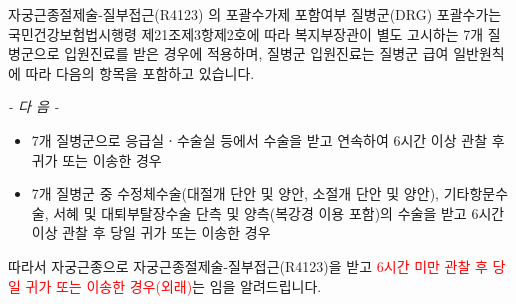 \begin{commentbox}{자궁근종절제술-질부접근(R4123) 의 포괄수가제 포함여부}
질병군(DRG) 포괄수가는 국민건강보험법시행령 제21조제3항제2호에 따라 복지부장관이 별도 고시하는 7개 질병군으로 입원진료를 받은 경우에 적용하며, 질병군 입원진료는 질병군 급여 일반원칙에 따라 다음의 항목을 포함하고 있습니다.\par
\begin{center}\emph{- 다 음 -}\end{center}
\begin{itemize}\tightlist
\item 7개 질병군으로 응급실ㆍ수술실 등에서 수술을 받고 연속하여 6시간 이상 관찰 후 귀가 또는 이송한 경우 
\item 7개 질병군 중 수정체수술(대절개 단안 및 양안, 소절개 단안 및 양안), 기타항문수술, 서혜 및 대퇴부탈장수술 단측 및 양측(복강경 이용 포함)의 수술을 받고 6시간 이상 관찰 후 당일 귀가 또는 이송한 경우
\end{itemize}
따라서 자궁근종으로 자궁근종절제술-질부접근(R4123)을 받고 \textcolor{red}{6시간 미만 관찰 후 당일 귀가 또는 이송한 경우(외래)}는 임을 알려드립니다.
\end{commentbox}
\prezi{\clearpage}
\par
\medskip
{}
\prezi{\clearpage}
\par
\medskip
{}
\prezi{\clearpage}
\par
\medskip
{}
